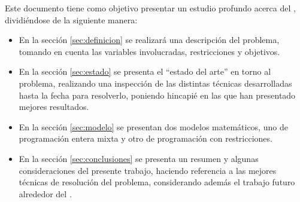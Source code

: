 Este documento tiene como objetivo presentar un estudio profundo acerca del \mrp, dividiéndose de la siguiente manera:
\begin{itemize}
	\item En la sección \ref{sec:definicion} se realizará una descripción del problema, tomando en cuenta las variables involucradas, restricciones y objetivos.
	\item En la sección \ref{sec:estado} se presenta el ``estado del arte'' en torno al problema, realizando una inspección de las distintas técnicas desarrolladas hasta la fecha para resolverlo, poniendo hincapié en las que han presentado mejores resultados. 
	\item En la sección \ref{sec:modelo} se presentan dos modelos matemáticos, uno de programación entera mixta y otro de programación con restricciones.
	\item En la sección \ref{sec:conclusiones} se presenta un resumen y algunas consideraciones del presente trabajo, haciendo referencia a las mejores técnicas de resolución del problema, considerando además el trabajo futuro alrededor del \mrp.
\end{itemize}
  


